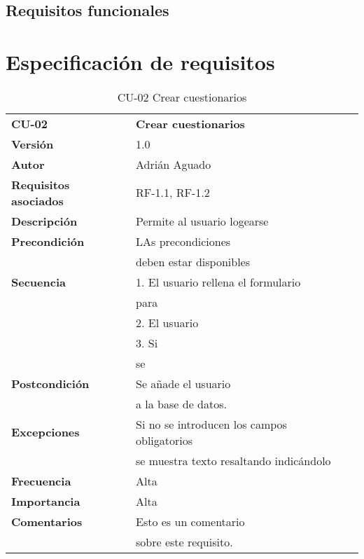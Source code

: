\subsection{Requisitos funcionales}\label{r-funcionales}

\section{Especificación de requisitos}\label{r-nfuncionales}



\begin{table}
\begin{tabular}{llr}  
\toprule
\begin{minipage}[b]{0.23\columnwidth}\raggedright\strut
\textbf{CU-02}\strut
\end{minipage} & \begin{minipage}[b]{0.71\columnwidth}\raggedright\strut
\textbf{Crear cuestionarios}\strut
\end{minipage}\tabularnewline
\cmidrule(r){1-2}
\textbf{Versión}       & 1.0           \\
\textbf{Autor}       & Adrián  Aguado    \\
\textbf{Requisitos asociados}       & RF-1.1, RF-1.2 \\ 
\textbf{Descripción} & Permite al usuario logearse\\
\textbf{Precondición} & LAs precondiciones \\
& deben estar disponibles        \\
\textbf{Secuencia} & 1. El usuario rellena el formulario \\
& para\\
& 2. El usuario \\
& 3. Si\\
& se        \\
\textbf{Postcondición} & Se añade el usuario \\
& a la base de datos.     \\
\textbf{Excepciones} &  Si no se introducen los campos obligatorios \\
& se muestra texto resaltando indicándolo
          \\
\textbf{Frecuencia} & Alta            \\
\textbf{Importancia} & Alta            \\
\textbf{Comentarios } & Esto es un comentario        \\
& sobre este requisito.     \\
\bottomrule
\end{tabular}
\caption{CU-02 Crear cuestionarios} \label{tab:sometab}
\end{table}
